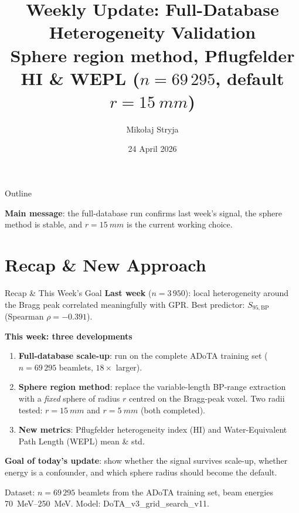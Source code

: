 \documentclass[aspectratio=169, 10pt]{beamer}
\title[ADoTA Heterogeneity Analysis]{Weekly Update: Full-Database Heterogeneity Validation\\[4pt]
{\small Sphere region method, Pflugfelder HI \& WEPL
($n = 69\,295$, default $r = \SI{15}{mm}$)}}
\author[M.~Stryja]{Mikołaj Stryja}
\institute{Department of Radiation Science \& Technology}
\date{24 April 2026}
\begin{document}
\begin{frame}[plain]
  \titlepage
\end{frame}

\begin{frame}{Outline}
  \tableofcontents

  \vspace{6pt}
  {\small
  \textbf{Main message}: the full-database run confirms last week's signal,
  the sphere method is stable, and \textbf{$r = \SI{15}{mm}$} is the current
  working choice.}
\end{frame}

\section{Recap \& New Approach}

\begin{frame}{Recap \& This Week's Goal}
  \textbf{Last week} ($n = 3\,950$):
  local heterogeneity around the Bragg peak correlated meaningfully with GPR.
  Best predictor: $S_{95,\text{BP}}$
  (Spearman $\rho = {-0.391}$).

  \vspace{6pt}
  \textbf{This week: three developments}
  \begin{enumerate}
    \item \textbf{Full-database scale-up}: run on the complete ADoTA
          training set ($n = 69\,295$ beamlets, $18\times$ larger).
    \item \textbf{Sphere region method}: replace the variable-length
          BP-range extraction with a \emph{fixed} sphere of radius
          $r$ centred on the Bragg-peak voxel.
          Two radii tested: $r = \SI{15}{mm}$ and
          $r = \SI{5}{mm}$ (both completed).
    \item \textbf{New metrics}: Pflugfelder heterogeneity index (HI)
          and Water-Equivalent Path Length (WEPL) mean \& std.
  \end{enumerate}

  \vspace{4pt}
  \textbf{Goal of today's update}: show whether the signal survives
  scale-up, whether energy is a confounder, and which sphere radius
  should become the default.

  \vspace{4pt}
  {\small Dataset: $n = 69\,295$ beamlets from the ADoTA training set,
  beam energies \SIrange{70}{250}{MeV}.  Model: DoTA\_v3\_grid\_search\_v11.}
\end{frame}
\end{document}
